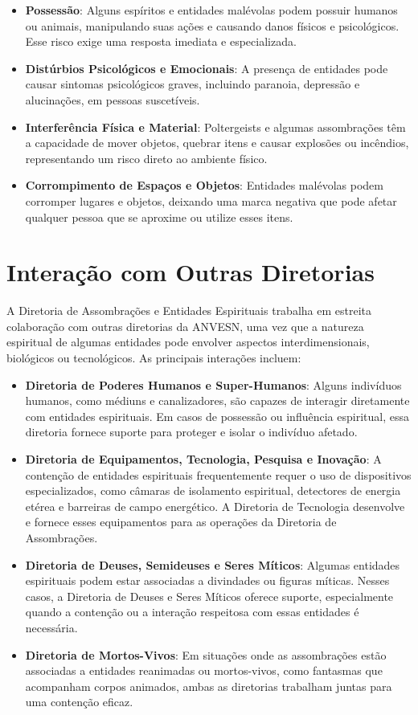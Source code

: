 \begin{itemize}
    \item \textbf{Possessão}: Alguns espíritos e entidades malévolas podem possuir humanos ou animais, manipulando suas ações e causando danos físicos e psicológicos. Esse risco exige uma resposta imediata e especializada.
    \item \textbf{Distúrbios Psicológicos e Emocionais}: A presença de entidades pode causar sintomas psicológicos graves, incluindo paranoia, depressão e alucinações, em pessoas suscetíveis.
    \item \textbf{Interferência Física e Material}: Poltergeists e algumas assombrações têm a capacidade de mover objetos, quebrar itens e causar explosões ou incêndios, representando um risco direto ao ambiente físico.
    \item \textbf{Corrompimento de Espaços e Objetos}: Entidades malévolas podem corromper lugares e objetos, deixando uma marca negativa que pode afetar qualquer pessoa que se aproxime ou utilize esses itens. 
\end{itemize}

\section{Interação com Outras Diretorias}

A Diretoria de Assombrações e Entidades Espirituais trabalha em estreita colaboração com outras diretorias da ANVESN, uma vez que a natureza espiritual de algumas entidades pode envolver aspectos interdimensionais, biológicos ou tecnológicos. As principais interações incluem:

\begin{itemize}
    \item \textbf{Diretoria de Poderes Humanos e Super-Humanos}: Alguns indivíduos humanos, como médiuns e canalizadores, são capazes de interagir diretamente com entidades espirituais. Em casos de possessão ou influência espiritual, essa diretoria fornece suporte para proteger e isolar o indivíduo afetado.
    \item \textbf{Diretoria de Equipamentos, Tecnologia, Pesquisa e Inovação}: A contenção de entidades espirituais frequentemente requer o uso de dispositivos especializados, como câmaras de isolamento espiritual, detectores de energia etérea e barreiras de campo energético. A Diretoria de Tecnologia desenvolve e fornece esses equipamentos para as operações da Diretoria de Assombrações.
    \item \textbf{Diretoria de Deuses, Semideuses e Seres Míticos}: Algumas entidades espirituais podem estar associadas a divindades ou figuras míticas. Nesses casos, a Diretoria de Deuses e Seres Míticos oferece suporte, especialmente quando a contenção ou a interação respeitosa com essas entidades é necessária.
    \item \textbf{Diretoria de Mortos-Vivos}: Em situações onde as assombrações estão associadas a entidades reanimadas ou mortos-vivos, como fantasmas que acompanham corpos animados, ambas as diretorias trabalham juntas para uma contenção eficaz.
\end{itemize}

